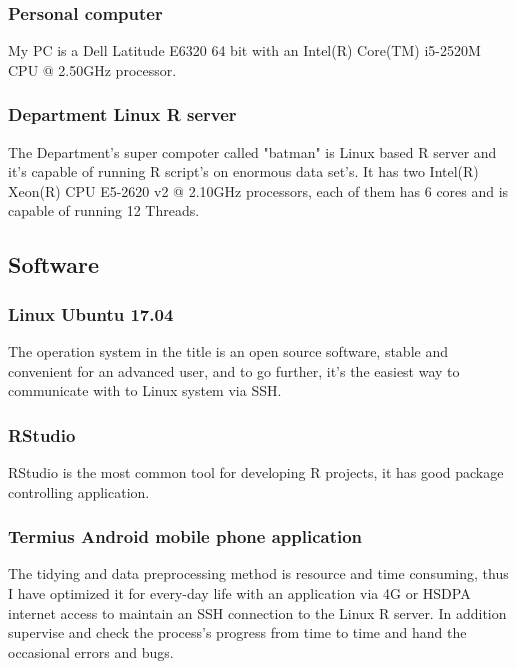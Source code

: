 			\subsubsection{Personal computer}
My PC is a Dell Latitude E6320 64 bit with an Intel(R) Core(TM) i5-2520M CPU @ 2.50GHz processor.
\cite{Latitude}
			\subsubsection{Department Linux R server}
The Department's super compoter called "batman" is Linux based R server and it's capable of running R script's on enormous data set's. It has two Intel(R) Xeon(R) CPU E5-2620 v2 @ 2.10GHz processors, each of them has 6 cores and is capable of running 12 Threads.
\cite{Batman}
		\subsection{Software}
			\subsubsection{Linux Ubuntu 17.04}
The operation system in the title is an open source software, stable and convenient for an advanced user, and to go further, it's the easiest way to communicate with to Linux system via SSH.
\cite{Ubuntu}
			\subsubsection{RStudio}
RStudio is the most common tool for developing R projects, it has good package controlling application.
\cite{RStudio}
			\subsubsection{Termius Android mobile phone application}
The tidying and data preprocessing method is resource and time consuming, thus I have optimized it for every-day life with an application via 4G or HSDPA internet access to maintain an SSH connection to the Linux R server. In addition supervise and check the process's progress from time to time and hand the occasional errors and bugs.
\cite{Termius}
